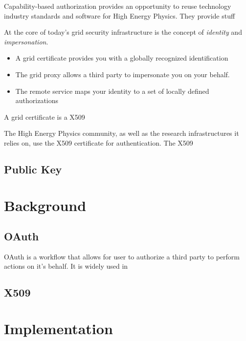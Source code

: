 \documentclass{webofc}
\begin{document}
Capability-based authorization provides an opportunity to reuse technology industry standards and software for High Energy Physics.  They provide stuff

At the core of today's grid security infrastructure is the concept of \textit{identity} and \textit{impersonation}.

\begin{itemize}
    \item A grid certificate provides you with a globally recognized identification
    \item The grid proxy allows a third party to impersonate you on your behalf.
    \item The remote service maps your identity to a set of locally defined authorizations
\end{itemize}

A grid certificate is a X509 \cite{housley1998internet} 




The High Energy Physics community, as well as the research infrastructures it relies on, use the X509 certificate for authentication.  The X509


\subsection{Public Key}





\section{Background}
\label{background}

\subsection{OAuth}
\label{sec:oauth}

OAuth is a workflow that allows for user to authorize a third party to perform actions on it's behalf.  It is widely used in 


\subsection{X509}
\label{sec:x509}

\section{Implementation}
\label{sec:implementation}
\end{document}
